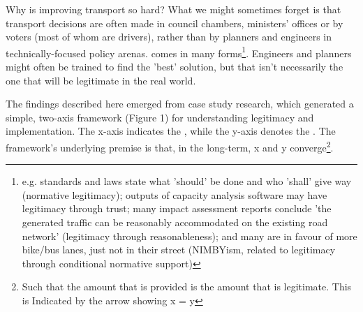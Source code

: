 \documentclass{tufte-handout}
\begin{document}
Why is improving transport so hard? What we might sometimes forget is that transport decisions are often made in council chambers, ministers' offices or by voters (most of whom are drivers), rather than by planners and engineers in technically-focused policy arenas.   comes in many forms\footnote{e.g. standards and laws state what 'should' be done and who 'shall' give way (normative legitimacy);  outputs of capacity analysis software may have legitimacy through trust; many impact assessment reports conclude 'the generated traffic can be reasonably accommodated on the existing road network' (legitimacy through reasonableness); and many are in favour of more bike/bus lanes, just not in their street (NIMBYism, related to legitimacy through conditional normative support)}. Engineers and planners might often be trained to find the 'best' solution, but that isn't necessarily the one that will be legitimate in the real world.   


The findings described here emerged from case study research, which generated a simple, two-axis framework (Figure 1) for understanding legitimacy and implementation. The x-axis indicates the , while the y-axis denotes the .  The framework's underlying premise is that, in the long-term,  x and y converge\footnote{Such that the amount that is provided is the amount that is legitimate. This is Indicated by the arrow showing x = y}. 
\end{document}
